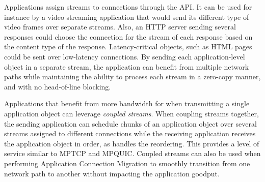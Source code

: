 Applications assign \tcpls streams to \tcp connections through the \tcpls 
API.
It can be used for instance by a video
streaming application that would send its different type of video frames over
separate streams.  Also, an HTTP server sending several responses could choose
the \tcp connection for the stream of each response based on the content type of
the response. Latency-critical objects, such as HTML pages could be sent over
low-latency connections.  By sending each application-level object in a separate
stream, the application can benefit from multiple network paths while
maintaining the ability to process each stream in a zero-copy manner, and
with no head-of-line blocking.

Applications that benefit from more bandwidth for when transmitting a single 
application object can leverage \tcpls \textit{coupled streams}.  When coupling 
streams 
together, the sending application can schedule chunks of an application object 
over several 
streams assigned to different \tcp connections while the receiving application 
receives the application object in order, as \tcpls handles the reordering. 
This provides a level of service similar to MPTCP and MPQUIC. Coupled streams 
can also be used when performing Application Connection Migration to smoothly 
transition from one network path to another without impacting the application 
goodput.



